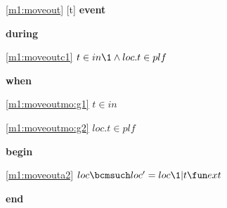 \noindent \ref{m1:moveout} [t] \textbf{event}
\begin{block}
  \item   \textbf{during}
  \begin{block}
  \item[ \eqref{m1:moveoutc1} ]$t \in in  %
  		\1\land loc.t \in plf $ %
  \end{block}
  \item   \textbf{when}
  \begin{block}
  \item[ \eqref{m1:moveoutmo:g1} ]$t \in in $ %
  \item[ \eqref{m1:moveoutmo:g2} ]$loc.t \in plf $ %
  \end{block}
  \item   \textbf{begin}
  \begin{block}
  \item[ \eqref{m1:moveouta2} ]$loc \bcmsuch loc' = loc \1 | t \fun ext $ %
  \end{block}
  \item   \textbf{end} \\
\end{block}
